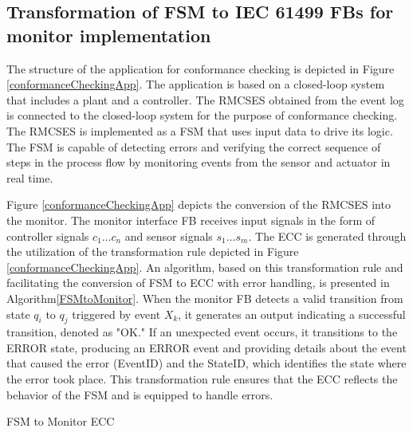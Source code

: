 \begin{bibunit}
\subsection{Transformation of FSM to IEC 61499 FBs for monitor implementation}


The structure of the application for conformance checking is depicted in Figure \ref{conformanceCheckingApp}. The application is based on a closed-loop system that includes a plant and a controller. The RMCSES obtained from the event log is connected to the closed-loop system for the purpose of conformance checking. The RMCSES is implemented as a FSM that uses input data to drive its logic. The FSM is capable of detecting errors and verifying the correct sequence of steps in the process flow by monitoring events from the sensor and actuator in real time.







Figure \ref{conformanceCheckingApp} depicts the conversion of the RMCSES into the monitor. The monitor interface FB receives input signals in the form of controller signals $c_1 \dots c_n$ and sensor signals $s_1 \dots s_m$. The ECC is generated through the utilization of the transformation rule depicted in Figure \ref{conformanceCheckingApp}. An algorithm, based on this transformation rule and facilitating the conversion of FSM to ECC with error handling, is presented in Algorithm\ref{FSMtoMonitor}. When the monitor FB detects a valid transition from state $q_i$ to $q_j$ triggered by event $X_k$, it generates an output indicating a successful transition, denoted as "OK." If an unexpected event occurs, it transitions to the ERROR state, producing an ERROR event and providing details about the event that caused the error (EventID) and the StateID, which identifies the state where the error took place. This transformation rule ensures that the ECC reflects the behavior of the FSM  and is equipped to handle errors.









\begin{algorithm}[t]
    \caption{FSM to Monitor ECC }
    \label{FSMtoMonitor}


\end{algorithm}
\end{bibunit}
